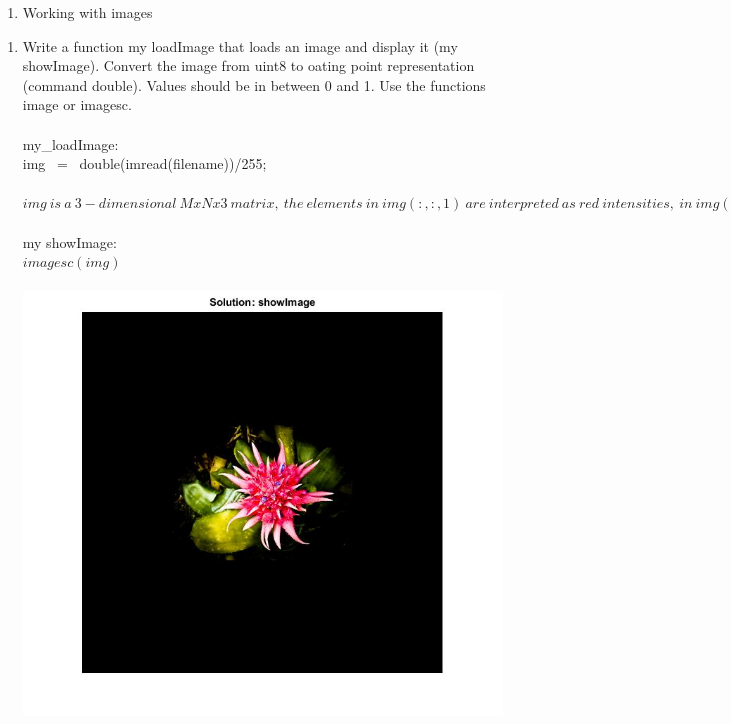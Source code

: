 



\graphicspath{ {images/} }

 
    \begin{enumerate}
         \item[Exercise 1:] Working with images
    \end{enumerate}
    \begin{enumerate}
        \item[(a)] Write a function my loadImage that loads an image and display it (my showImage). Convert the image from uint8 to oating point representation (command double). Values should be in between 0 and 1. Use the functions image or imagesc.
        \\
        \\ my_loadImage:
        \\  img \ = \ double(imread(filename))/255;
        \\\\ $img \ is \ a \ 3-dimensional \ MxNx3 \ matrix, \ the \ elements \ in \ img(:,:,1) \ are \ interpreted \ as \ red \ intensities, \ in \ img(:,:,2) \ as \ green \ intensities, \ and \ in \ img(:,:,3) \ as \ blue \ intensities.$
        \\\\ my showImage:
        \\ $ imagesc(img) $
        \\\\
    	\centering
        \includegraphics[scale=0.58]{images/SolutionFirstPart.jpg} 

\end{enumerate}

